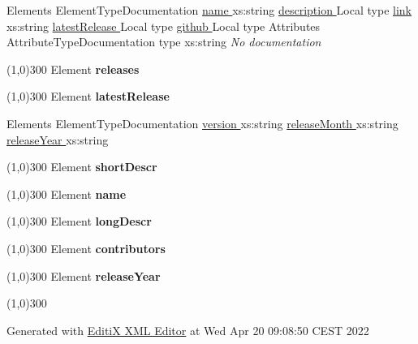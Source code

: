 { Elements
 ElementTypeDocumentation
 \hyperlink{element_name}{
 name
 }
 xs:string
 \textit{}
 \hyperlink{element_description}{
 description
 }
 Local type
 \textit{}
 \hyperlink{element_link}{
 link
 }
 xs:string
 \textit{}
 \hyperlink{element_latestRelease}{
 latestRelease
 }
 Local type
 \textit{}
 \hyperlink{element_github}{
 github
 }
 Local type
 \textit{}
 Attributes
 AttributeTypeDocumentation
 type
 xs:string
 \textit{
 No documentation
 }

\line(1,0){300}
\hypertarget{element_releases}{}
 Element
 \textbf{
 releases
 }

\line(1,0){300}
\hypertarget{element_latestRelease}{}
 Element
 \textbf{
 latestRelease
 }
 
 Elements
 ElementTypeDocumentation
 \hyperlink{element_version}{
 version
 }
 xs:string
 \textit{}
 \hyperlink{element_releaseMonth}{
 releaseMonth
 }
 xs:string
 \textit{}
 \hyperlink{element_releaseYear}{
 releaseYear
 }
 xs:string
 \textit{}

\line(1,0){300}
\hypertarget{element_shortDescr}{}
 Element
 \textbf{
 shortDescr
 }

\line(1,0){300}
\hypertarget{element_name}{}
 Element
 \textbf{
 name
 }

\line(1,0){300}
\hypertarget{element_longDescr}{}
 Element
 \textbf{
 longDescr
 }

\line(1,0){300}
\hypertarget{element_contributors}{}
 Element
 \textbf{
 contributors
 }

\line(1,0){300}
\hypertarget{element_releaseYear}{}
 Element
 \textbf{
 releaseYear
 }

\line(1,0){300}



{\centering{}Generated with \href{http://www.editix.com}{EditiX XML Editor} at Wed Apr 20 09:08:50 CEST 2022\par}

\clearpage


}
